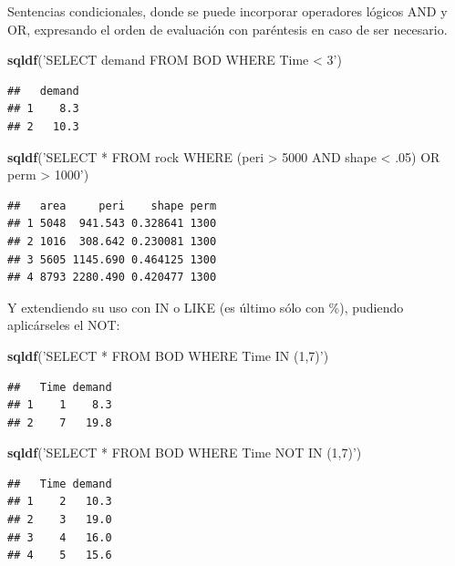 \documentclass[]{book}
\newenvironment{Shaded}{\begin{snugshade}}{\end{snugshade}}
\newcommand{\KeywordTok}[1]{\textcolor[rgb]{0.13,0.29,0.53}{\textbf{#1}}}
\newcommand{\StringTok}[1]{\textcolor[rgb]{0.31,0.60,0.02}{#1}}
\newcommand{\NormalTok}[1]{#1}
\begin{document}
Sentencias condicionales, donde se puede incorporar operadores lógicos
AND y OR, expresando el orden de evaluación con paréntesis en caso de
ser necesario.

\begin{Shaded}
\begin{Highlighting}[]
\KeywordTok{sqldf}\NormalTok{(}\StringTok{'SELECT demand FROM BOD WHERE Time < 3'}\NormalTok{)}
\end{Highlighting}
\end{Shaded}

\begin{verbatim}
##   demand
## 1    8.3
## 2   10.3
\end{verbatim}

\begin{Shaded}
\begin{Highlighting}[]
\KeywordTok{sqldf}\NormalTok{(}\StringTok{'SELECT * FROM rock WHERE (peri > 5000 AND shape < .05) OR perm > 1000'}\NormalTok{)}
\end{Highlighting}
\end{Shaded}

\begin{verbatim}
##   area     peri    shape perm
## 1 5048  941.543 0.328641 1300
## 2 1016  308.642 0.230081 1300
## 3 5605 1145.690 0.464125 1300
## 4 8793 2280.490 0.420477 1300
\end{verbatim}

Y extendiendo su uso con IN o LIKE (es último sólo con \%), pudiendo
aplicárseles el NOT:

\begin{Shaded}
\begin{Highlighting}[]
\KeywordTok{sqldf}\NormalTok{(}\StringTok{'SELECT * FROM BOD WHERE Time IN (1,7)'}\NormalTok{)}
\end{Highlighting}
\end{Shaded}

\begin{verbatim}
##   Time demand
## 1    1    8.3
## 2    7   19.8
\end{verbatim}

\begin{Shaded}
\begin{Highlighting}[]
\KeywordTok{sqldf}\NormalTok{(}\StringTok{'SELECT * FROM BOD WHERE Time NOT IN (1,7)'}\NormalTok{)}
\end{Highlighting}
\end{Shaded}

\begin{verbatim}
##   Time demand
## 1    2   10.3
## 2    3   19.0
## 3    4   16.0
## 4    5   15.6
\end{verbatim}
\end{document}
